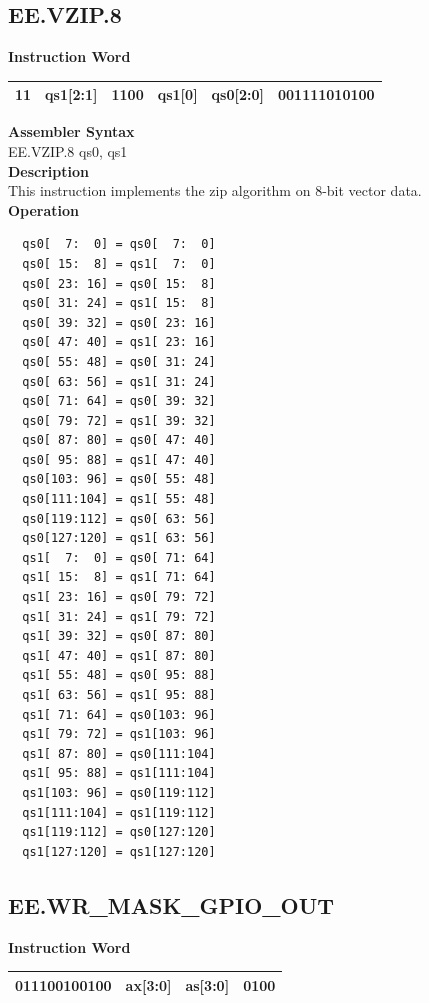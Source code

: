 \clearpage
\subsection{EE.VZIP.8}\label{instruction:EEVZIP8}
\setlength\tabcolsep{6pt}
\textbf{Instruction Word} \\
\begin{tabular}{|c|c|c|c|c|c|}
	\hline
	11 & qs1[2:1] & 1100 & qs1[0] & qs0[2:0] & 001111010100 \\
	\hline
\end{tabular}

\textbf{Assembler Syntax} \\
EE.VZIP.8 qs0, qs1 \\
\textbf{Description} \\
This instruction implements the zip algorithm on 8-bit vector data.\\
\textbf{Operation}
\begin{lstlisting}
  qs0[  7:  0] = qs0[  7:  0]
  qs0[ 15:  8] = qs1[  7:  0]
  qs0[ 23: 16] = qs0[ 15:  8]
  qs0[ 31: 24] = qs1[ 15:  8]
  qs0[ 39: 32] = qs0[ 23: 16]
  qs0[ 47: 40] = qs1[ 23: 16]
  qs0[ 55: 48] = qs0[ 31: 24]
  qs0[ 63: 56] = qs1[ 31: 24]
  qs0[ 71: 64] = qs0[ 39: 32]
  qs0[ 79: 72] = qs1[ 39: 32]
  qs0[ 87: 80] = qs0[ 47: 40]
  qs0[ 95: 88] = qs1[ 47: 40]
  qs0[103: 96] = qs0[ 55: 48]
  qs0[111:104] = qs1[ 55: 48]
  qs0[119:112] = qs0[ 63: 56]
  qs0[127:120] = qs1[ 63: 56]
  qs1[  7:  0] = qs0[ 71: 64]
  qs1[ 15:  8] = qs1[ 71: 64]
  qs1[ 23: 16] = qs0[ 79: 72]
  qs1[ 31: 24] = qs1[ 79: 72]
  qs1[ 39: 32] = qs0[ 87: 80]
  qs1[ 47: 40] = qs1[ 87: 80]
  qs1[ 55: 48] = qs0[ 95: 88]
  qs1[ 63: 56] = qs1[ 95: 88]
  qs1[ 71: 64] = qs0[103: 96]
  qs1[ 79: 72] = qs1[103: 96]
  qs1[ 87: 80] = qs0[111:104]
  qs1[ 95: 88] = qs1[111:104]
  qs1[103: 96] = qs0[119:112]
  qs1[111:104] = qs1[119:112]
  qs1[119:112] = qs0[127:120]
  qs1[127:120] = qs1[127:120]
\end{lstlisting}

\clearpage
\subsection{EE.WR\_MASK\_GPIO\_OUT}\label{instruction:EEWRMASKGPIOOUT}
\setlength\tabcolsep{6pt}
\textbf{Instruction Word} \\
\begin{tabular}{|c|c|c|c|}
	\hline
	011100100100 & ax[3:0] & as[3:0] & 0100 \\
	\hline
\end{tabular}

